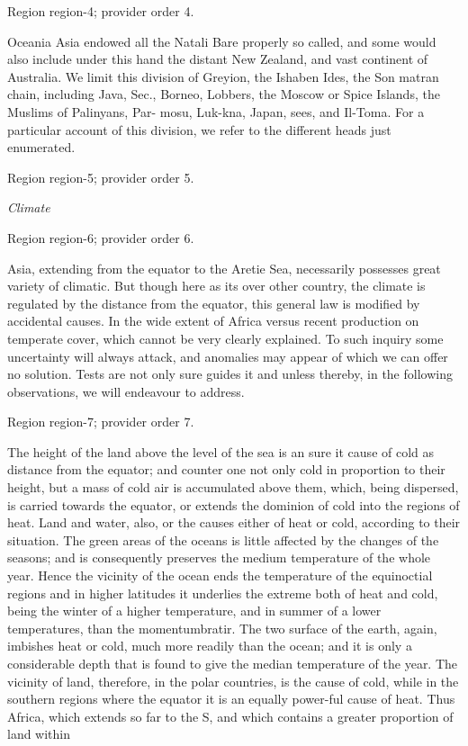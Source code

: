 \documentclass[11pt]{article}
\begin{document}
{\scriptsize\color{gray} Region region-4; provider order 4.\par}
\medskip

Oceania Asia endowed all the Natali Bare properly so called, and some would also include under this hand the distant New Zealand, and vast continent of Australia. We limit this division of Greyion, the Ishaben Ides, the Son matran chain, including Java, Sec., Borneo, Lobbers, the Moscow or Spice Islands, the Muslims of Palinyans, Par- mosu, Luk-kna, Japan, sees, and Il-Toma. For a particular account of this division, we refer to the different heads just enumerated.
\par

{\scriptsize\color{gray} Region region-5; provider order 5.\par}
\medskip

{\small\itshape Climate\par}

{\scriptsize\color{gray} Region region-6; provider order 6.\par}
\medskip

Asia, extending from the equator to the Aretie Sea, necessarily possesses great variety of climatic. But though here as its over other country, the climate is regulated by the distance from the equator, this general law is modified by accidental causes. In the wide extent of Africa versus recent production on temperate cover, which cannot be very clearly explained. To such inquiry some uncertainty will always attack, and anomalies may appear of which we can offer no solution. Tests are not only sure guides it and unless thereby, in the following observations, we will endeavour to address.
\par

{\scriptsize\color{gray} Region region-7; provider order 7.\par}
\medskip

The height of the land above the level of the sea is an sure it cause of cold as distance from the equator; and counter one not only cold in proportion to their height, but a mass of cold air is accumulated above them, which, being dispersed, is carried towards the equator, or extends the dominion of cold into the regions of heat. Land and water, also, or the causes either of heat or cold, according to their situation. The green areas of the oceans is little affected by the changes of the seasons; and is consequently preserves the medium temperature of the whole year. Hence the vicinity of the ocean ends the temperature of the equinoctial regions and in higher latitudes it underlies the extreme both of heat and cold, being the winter of a higher temperature, and in summer of a lower temperatures, than the momentumbratir. The two surface of the earth, again, imbishes heat or cold, much more readily than the ocean; and it is only a considerable depth that is found to give the median temperature of the year. The vicinity of land, therefore, in the polar countries, is the cause of cold, while in the southern regions where the equator it is an equally power-ful cause of heat. Thus Africa, which extends so far to the S, and which contains a greater proportion of land within
\par
\end{document}
